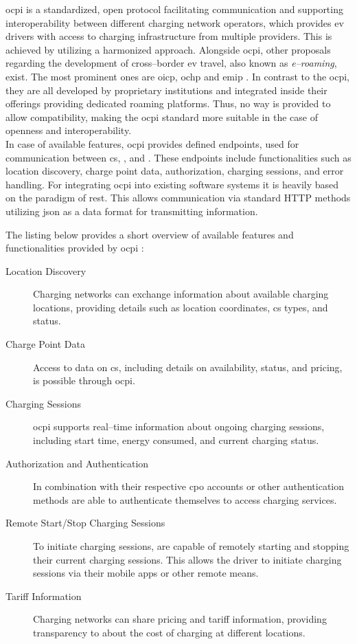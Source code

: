 \acrfull{ocpi} is a standardized, open protocol facilitating communication and supporting interoperability between different charging network operators, which provides \acrshort{ev} drivers with access to charging infrastructure from multiple providers. This is achieved by utilizing a harmonized approach. 
Alongside \acrshort{ocpi}, other proposals regarding the development of cross--border \acrshort{ev} travel, also known as \textit{e--roaming}, exist. 
The most prominent ones are \acrfull{oicp}, \acrfull{ochp} and \acrfull{emip} \cite{ferwerda_advancing_2018}. 
In contrast to the \acrshort{ocpi}, they are all developed by proprietary institutions and integrated inside their offerings providing dedicated roaming platforms. 
Thus, no way is provided to allow compatibility, making the \acrshort{ocpi} standard more suitable in the case of openness and interoperability. \\
\noindent In case of available features, \acrshort{ocpi} provides defined endpoints, used for communication between \acrshort{cs}, ,  and . These endpoints include functionalities such as location discovery, charge point data, authorization, charging sessions, and error handling. 
For integrating \acrshort{ocpi} into existing software systems it is heavily based on the paradigm of \acrfull{rest}. This allows communication via standard HTTP methods utilizing \acrfull{json} as a data format for transmitting information. 

\noindent The listing below provides a short overview of available features and functionalities provided by \acrshort{ocpi} \cite{noauthor_open_2021}:

\begin{description}
    \item[Location Discovery] Charging networks can exchange information about available charging locations, providing details such as location coordinates, \acrshort{cs} types, and status.
    \item[Charge Point Data] Access to data on \acrshort{cs}, including details on availability, status, and pricing, is possible through \acrshort{ocpi}.
    \item[Charging Sessions] \acrshort{ocpi} supports real--time information about ongoing charging sessions, including start time, energy consumed, and current charging status.
    \item[Authorization and Authentication] In combination with their respective \acrshort{cpo} accounts or other authentication methods  are able to authenticate themselves to access charging services.
    \item[Remote Start/Stop Charging Sessions] To initiate charging sessions,  are capable of remotely starting and stopping their current charging sessions. This allows the driver to initiate charging sessions via their mobile apps or other remote means.
    \item[Tariff Information] Charging networks can share pricing and tariff information, providing transparency to  about the cost of charging at different locations.
\end{description}


